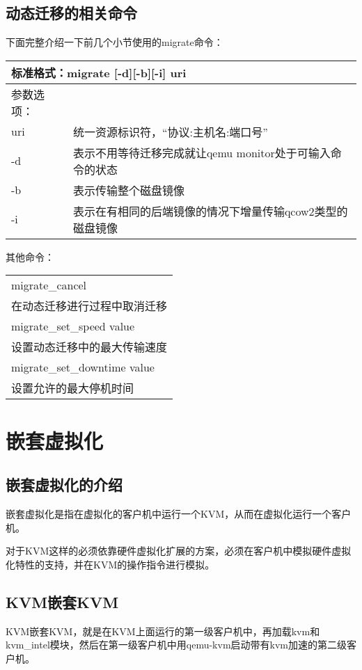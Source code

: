 \documentclass[a4paper,left=2.5cm,right=2.5cm,11pt]{article}
\newcommand{\interval}{\vspace{0.5em}}
\begin{document}
\subsection{动态迁移的相关命令}
	下面完整介绍一下前几个小节使用的migrate命令：
	\interval
	\begin{longtable}{p{2cm}p{10cm}}
	\hline
	\multicolumn{2}{l}{标准格式：migrate [-d][-b][-i] uri} \\
	\hline
	参数选项： & \\
	\hline
	uri & 统一资源标识符，“协议:主机名:端口号” \\
	\hline
	-d & 表示不用等待迁移完成就让qemu monitor处于可输入命令的状态 \\
	\hline
	-b & 表示传输整个磁盘镜像 \\
	\hline
	-i & 表示在有相同的后端镜像的情况下增量传输qcow2类型的磁盘镜像 \\
	\hline
	\end{longtable}

	\clearpage

	其他命令：
	\interval
	\begin{longtable}{p{7cm}}
	\hline
	migrate\_cancel \\
	在动态迁移进行过程中取消迁移 \\
	\hline
	migrate\_set\_speed value \\
	设置动态迁移中的最大传输速度 \\
	\hline
	migrate\_set\_downtime value \\
	设置允许的最大停机时间 \\
	\hline
	\end{longtable}

\clearpage

\section{嵌套虚拟化}
\subsection{嵌套虚拟化的介绍}
	嵌套虚拟化是指在虚拟化的客户机中运行一个KVM，从而在虚拟化运行一个客户机。\par
	对于KVM这样的必须依靠硬件虚拟化扩展的方案，必须在客户机中模拟硬件虚拟化特性的支持，并在KVM的操作指令进行模拟。

\subsection{KVM嵌套KVM}
	KVM嵌套KVM，就是在KVM上面运行的第一级客户机中，再加载kvm和kvm\_intel模块，然后在第一级客户机中用qemu-kvm启动带有kvm加速的第二级客户机。\par
\end{document}
